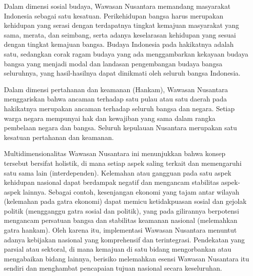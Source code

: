 \documentclass[12pt, a4paper]{article}
\begin{document}
Dalam dimensi sosial budaya, Wawasan Nusantara memandang masyarakat Indonesia sebagai satu kesatuan. Perikehidupan bangsa harus merupakan kehidupan yang serasi dengan terdapatnya tingkat kemajuan masyarakat yang sama, merata, dan seimbang, serta adanya keselarasan kehidupan yang sesuai dengan tingkat kemajuan bangsa. Budaya Indonesia pada hakikatnya adalah satu, sedangkan corak ragam budaya yang ada menggambarkan kekayaan budaya bangsa yang menjadi modal dan landasan pengembangan budaya bangsa seluruhnya, yang hasil-hasilnya dapat dinikmati oleh seluruh bangsa Indonesia.  

Dalam dimensi pertahanan dan keamanan (Hankam), Wawasan Nusantara menggariskan bahwa ancaman terhadap satu pulau atau satu daerah pada hakikatnya merupakan ancaman terhadap seluruh bangsa dan negara. Setiap warga negara mempunyai hak dan kewajiban yang sama dalam rangka pembelaan negara dan bangsa. Seluruh kepulauan Nusantara merupakan satu kesatuan pertahanan dan keamanan.  

Multidimensionalitas Wawasan Nusantara ini menunjukkan bahwa konsep tersebut bersifat holistik, di mana setiap aspek saling terkait dan memengaruhi satu sama lain (interdependen). Kelemahan atau gangguan pada satu aspek kehidupan nasional dapat berdampak negatif dan mengancam stabilitas aspek-aspek lainnya. Sebagai contoh, kesenjangan ekonomi yang tajam antar wilayah (kelemahan pada gatra ekonomi) dapat memicu ketidakpuasan sosial dan gejolak politik (mengganggu gatra sosial dan politik), yang pada gilirannya berpotensi mengancam persatuan bangsa dan stabilitas keamanan nasional (melemahkan gatra hankam). Oleh karena itu, implementasi Wawasan Nusantara menuntut adanya kebijakan nasional yang komprehensif dan terintegrasi. Pendekatan yang parsial atau sektoral, di mana kemajuan di satu bidang mengorbankan atau mengabaikan bidang lainnya, berisiko melemahkan esensi Wawasan Nusantara itu sendiri dan menghambat pencapaian tujuan nasional secara keseluruhan.  
\end{document}
